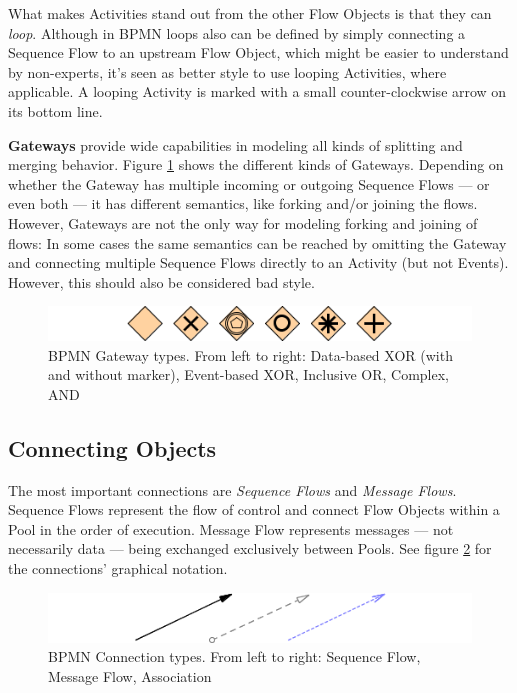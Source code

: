 What makes Activities stand out from the other Flow Objects is that they can
\emph{loop}.  Although in BPMN loops also can be defined by simply connecting a
Sequence Flow to an upstream Flow Object, which might be easier to understand by
non-experts, it's seen as better style to use looping Activities, where
applicable.  A looping Activity is marked with a small counter-clockwise arrow on
its bottom line.

\textbf{Gateways} provide wide capabilities in modeling all kinds of splitting
and merging behavior.  Figure \ref{fig:gateways} shows the different kinds of
Gateways.  Depending on whether the Gateway has multiple incoming or outgoing
Sequence Flows --- or even both --- it has different semantics, like forking
and/or joining the flows.  However, Gateways are not the only way for modeling
forking and joining of flows: In some cases the same semantics can be reached
by omitting the Gateway and connecting multiple Sequence Flows directly to an
Activity (but not Events).  However, this should also be considered bad style.

\begin{figure}[ht]
	\centering
	\includegraphics[width=.75\textwidth]{figures/bpmn/gateways.png}
	\caption[BPMN Gateway types]{BPMN Gateway types.  From left to right: Data-based
	XOR (with and without marker), Event-based XOR, Inclusive OR, Complex, AND}
	\label{fig:gateways}
\end{figure}


\subsection{Connecting Objects}

The most important connections are \emph{Sequence Flows} and \emph{Message Flows}.
Sequence Flows represent the flow of control and connect Flow Objects within a
Pool in the order of execution.  Message Flow represents messages --- not
necessarily data --- being exchanged exclusively between Pools.  See figure
\ref{fig:connections} for the connections' graphical notation.

\begin{figure}[ht]
	\centering
	\includegraphics[width=.75\textwidth]{figures/bpmn/connections.png}
	\caption[BPMN Connection types]{BPMN Connection types.  From left to right:
	Sequence Flow, Message Flow, Association}
	\label{fig:connections}
\end{figure}

